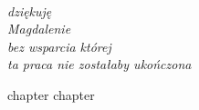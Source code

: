 \documentclass[
  a4paper,
  twoside,
  justified,
  nobib,
  marginals=raggedright,
]{tufte-book}
\begin{document}
\frontmatter
\maketitle

\cleardoublepage
\thispagestyle{empty}
~\vfill
\vfill
\begin{fullwidth}
\raggedleft\noindent\fontsize{16}{26}\selectfont\itshape
\nohyphenation
dziękuję \\
Magdalenie \\
bez wsparcia której \\
ta praca nie zostałaby ukończona
\end{fullwidth}
\vfill

\tableofcontents



\mainmatter

{chapter}
{chapter}

\end{document}
